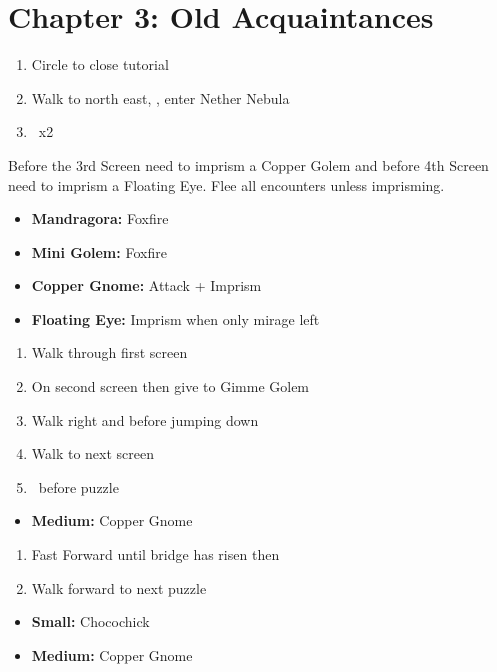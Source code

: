 \chapter{Chapter 3: Old Acquaintances}
\begin{enumerate}
	\item Circle to close tutorial
	\item Walk to north east, , enter Nether Nebula
	\item \cs\ x2
\end{enumerate}
\begin{encounters}
Before the 3rd Screen need to imprism a Copper Golem and before 4th Screen need to imprism a Floating Eye. Flee all encounters unless imprisming.
\vspace{\baselineskip}
	\begin{itemize}
		\item \textbf{Mandragora:} Foxfire
		\item \textbf{Mini Golem:} Foxfire
		\item \textbf{Copper Gnome:} Attack + Imprism
		\item \textbf{Floating Eye:} Imprism when only mirage left
	\end{itemize}
\end{encounters}
\begin{enumerate}[resume]
	\item Walk through first screen
	\item On second screen  then give to Gimme Golem
	\item Walk right and before jumping down 
	\item Walk to next screen
	\item \cs\ before puzzle
\end{enumerate}
\begin{puzzle}
	\begin{itemize}
		\item \textbf{Medium:} Copper Gnome
	\end{itemize}
\end{puzzle}
\begin{enumerate}[resume]
	\item Fast Forward until bridge has risen then \cs
	\item Walk forward to next puzzle
\end{enumerate}
\begin{puzzle}
	\begin{itemize}
		\item \textbf{Small:} Chocochick
		\item \textbf{Medium:} Copper Gnome
	\end{itemize}
\end{puzzle}
